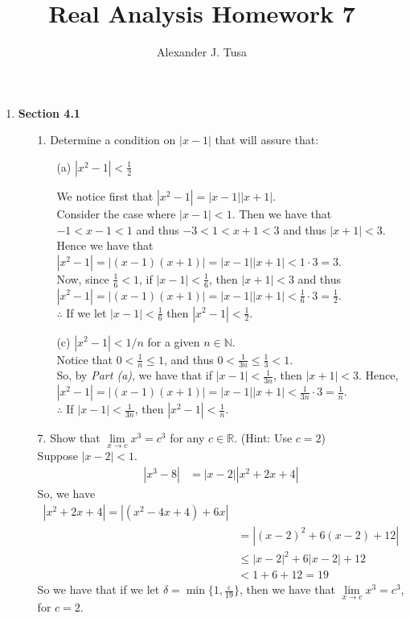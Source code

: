 \documentclass[12pt,letterpaper]{article}
\author{Alexander J. Tusa}
\title{Real Analysis Homework 7}
\newcommand{\R}{\mathbb{R}}
\newcommand{\N}{\mathbb{N}}
\theoremstyle{case}
\theoremstyle{definition}
\begin{document}
	\maketitle
	\begin{enumerate}
		\item \textbf{Section 4.1}
		\begin{enumerate}
			\item[1.] Determine a condition on $|x-1|$ that will assure that:
			\begin{enumerate}
				\item[(a)] $|x^2-1|<\frac{1}{2}$
				
				We notice first that $|x^2-1|=|x-1||x+1|$.\\
				
				Consider the case where $|x-1|<1$. Then we have that $-1 < x-1<1$ and thus $-3<1<x+1<3$ and thus $|x+1|<3$.\\
				
				Hence we have that $|x^2-1|=|(x-1)(x+1)|=|x-1||x+1|<1 \cdot 3 = 3$.\\
				
				Now, since $\frac{1}{6}<1$, if $|x-1|<\frac{1}{6}$, then $|x+1|<3$ and thus $|x^2-1|=|(x-1)(x+1)|=|x-1||x+1|<\frac{1}{6} \cdot 3 = \frac{1}{2}$.\\
				
				$\therefore$ If we let $|x-1|<\frac{1}{6}$ then $|x^2-1|<\frac{1}{2}$.\\
				
				\item[(c)] $|x^2-1|<1/n$ for a given $n \in \N$.\\
				
				Notice that $0<\frac{1}{n}\leq 1$, and thus $0<\frac{1}{3n}\leq \frac{1}{3}<1$.\\
				
				So, by \textit{Part (a)}, we have that if $|x-1|<\frac{1}{3n}$, then $|x+1|< 3$. Hence, $|x^2-1|=|(x-1)(x+1)|=|x-1||x+1|<\frac{1}{3n} \cdot 3 = \frac{1}{n}$.\\
				
				$\therefore$ If $|x-1|<\frac{1}{3n}$, then $|x^2-1|<\frac{1}{n}$.
			\end{enumerate}
		
			\item[7.] Show that $\lim\limits_{x \to c} x^3=c^3$ for any $c \in \R$. (Hint: Use $c=2$)\\
			
			Suppose $|x-2|<1$.
			\begin{align*}
				|x^3-8| &= |x-2||x^2+2x+4|
			\end{align*}
			So, we have 
			\begin{align*}
				|x^2+2x+4|=|(x^2-4x+4)+6x| \\
				&=|(x-2)^2+6(x-2)+12| \\
				&\leq |x-2|^2 + 6|x-2|+12 \\
				&< 1 +6 + 12 = 19
			\end{align*}
			So we have that if we let $\delta=\min \{1, \frac{\varepsilon}{19}\}$, then we have that $\lim\limits_{x \to c}x^3 = c^3$, for $c=2$.\\
			

\end{enumerate}
\end{enumerate}
\end{document}
